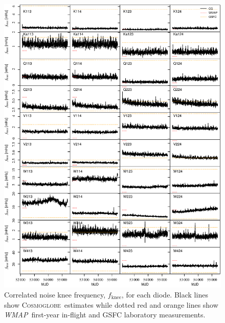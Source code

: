 \documentclass[twocolumn]{../../common/aa}
\def\WMAP{\emph{WMAP}}
\newcommand{\cosmoglobe}{\textsc{Cosmoglobe}}
\begin{document}
\begin{figure}[p]
	\centering
	\includegraphics[width=\textwidth]{figures/instpar_CG_fknee_v1.pdf}
	\caption{Correlated noise knee frequency, $f_{\mathrm{knee}}$, for each diode. Black lines show \cosmoglobe\ estimates while dotted red and orange lines show \WMAP\ first-year in-flight and GSFC laboratory measurements.}
	\label{fig:fknee}
\end{figure}
\end{document}

